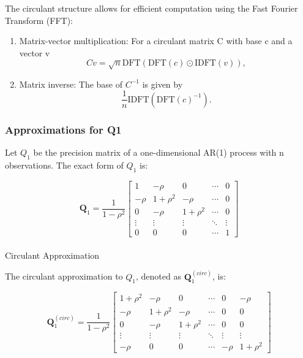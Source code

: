 \documentclass[journal=,manuscript=]{achemso}
\makeatletter
\let\oldparagraph\paragraph
\renewcommand{\paragraph}{
    \@ifstar
      \xxxParagraphStar
      \xxxParagraphNoStar
  }
\newcommand{\xxxParagraphStar}[1]{\oldparagraph*{#1}\mbox{}}
\newcommand{\xxxParagraphNoStar}[1]{\oldparagraph{#1}\mbox{}}
\makeatother
\begin{document}
The circulant structure allows for efficient computation using the Fast
Fourier Transform (FFT):

\begin{enumerate}
\def\labelenumi{\arabic{enumi}.}
\item
  Matrix-vector multiplication: For a circulant matrix C with base c and
  a vector v \[
  Cv = \sqrt{n} \text{DFT}(\text{DFT}(c) \odot \text{IDFT}(v)),
  \]
\item
  Matrix inverse: The base of \(C^{-1}\) is given by \[
  \frac{1}{n} \text{IDFT}(\text{DFT}(c)^{-1}).
  \]
\end{enumerate}

\subsubsection{Approximations for Q1}\label{approximations-for-q1}

Let \(Q_1\) be the precision matrix of a one-dimensional AR(1) process
with n observations. The exact form of \(Q_1\) is:

\[
\mathbf{Q}_1 = \frac{1}{1-\rho^2}
\begin{bmatrix}
1 & -\rho & 0 & \cdots & 0 \\
-\rho & 1+\rho^2 & -\rho & \cdots & 0 \\
0 & -\rho & 1+\rho^2 & \cdots & 0 \\
\vdots & \vdots & \vdots & \ddots & \vdots \\
0 & 0 & 0 & \cdots & 1
\end{bmatrix}
\]

\paragraph{Circulant Approximation}\label{circulant-approximation}

The circulant approximation to \(Q_1\), denoted as
\(\mathbf{Q}_1^{(circ)}\), is:

\[
\mathbf{Q}_1^{(circ)} = \frac{1}{1-\rho^2}
\begin{bmatrix}
1+\rho^2 & -\rho & 0 & \cdots & 0 & -\rho \\
-\rho & 1+\rho^2 & -\rho & \cdots & 0 & 0 \\
0 & -\rho & 1+\rho^2 & \cdots & 0 & 0 \\
\vdots & \vdots & \vdots & \ddots & \vdots & \vdots \\
-\rho & 0 & 0 & \cdots & -\rho & 1+\rho^2
\end{bmatrix}
\]
\end{document}
